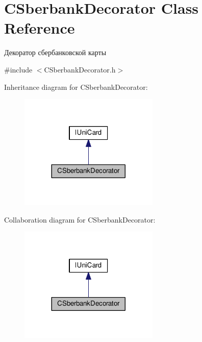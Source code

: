 \hypertarget{classCSberbankDecorator}{}\section{C\+Sberbank\+Decorator Class Reference}
\label{classCSberbankDecorator}


Декоратор сбербанковской карты  




{\ttfamily \#include $<$C\+Sberbank\+Decorator.\+h$>$}



Inheritance diagram for C\+Sberbank\+Decorator\+:\nopagebreak
\begin{figure}[H]
\begin{center}
\leavevmode
\includegraphics[width=188pt]{classCSberbankDecorator__inherit__graph}
\end{center}
\end{figure}


Collaboration diagram for C\+Sberbank\+Decorator\+:\nopagebreak
\begin{figure}[H]
\begin{center}
\leavevmode
\includegraphics[width=188pt]{classCSberbankDecorator__coll__graph}
\end{center}
\end{figure}
